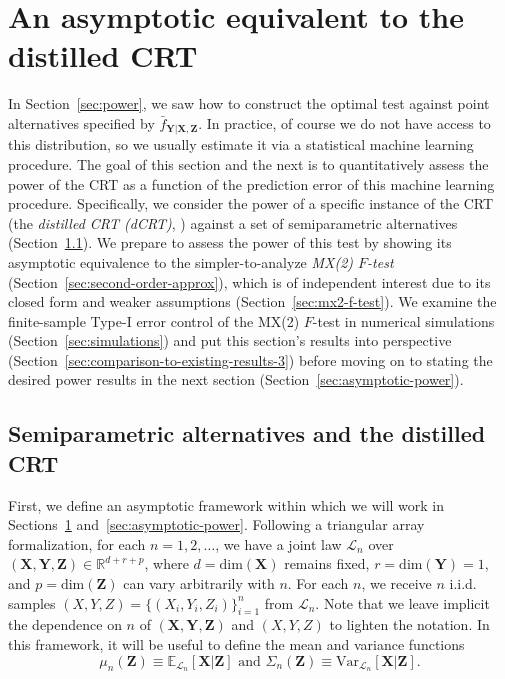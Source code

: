 \documentclass[ejs]{imsart}
\numberwithin{equation}{section}
\theoremstyle{plain}
\theoremstyle{definition}
\theoremstyle{remark}
\newcommand{\prx}{\bm X}
\newcommand{\srx}{X}
\newcommand{\prz}{\bm Z}
\newcommand{\srz}{Z}
\newcommand{\pry}{{\bm Y}}
\newcommand{\sry}{Y}
\begin{document}
\section{An asymptotic equivalent to the distilled CRT} \label{sec:weakening}

In Section~\ref{sec:power}, we saw how to construct the optimal test against point alternatives specified by $\bar f_{\pry|\prx,\prz}$. In practice, of course we do not have access to this distribution, so we usually estimate it via a statistical machine learning procedure. The goal of this section and the next is to quantitatively assess the power of the CRT as a function of the prediction error of this machine learning procedure. Specifically, we consider  the power of a specific instance of the CRT (the \textit{distilled CRT (dCRT)}, \cite{Liu2020})  against a set of semiparametric alternatives (Section~\ref{sec:asymptotic-setup}). We prepare to assess the power of this test by showing its asymptotic equivalence to the simpler-to-analyze \textit{MX(2) $F$-test} (Section~\ref{sec:second-order-approx}), which is of independent interest due to its closed form and weaker assumptions (Section~\ref{sec:mx2-f-test}). We examine the finite-sample Type-I error control of the MX(2) $F$-test in numerical simulations (Section~\ref{sec:simulations}) and put this section's results into perspective (Section~\ref{sec:comparison-to-existing-results-3}) before moving on to stating the desired power results in the next section (Section~\ref{sec:asymptotic-power}).


\subsection{Semiparametric alternatives and the distilled CRT} \label{sec:asymptotic-setup}

First, we define an asymptotic framework within which we will work in Sections~\ref{sec:weakening} and~\ref{sec:asymptotic-power}. Following a triangular array formalization, for each $n = 1, 2, \dots$, we have a joint law $\mathcal L_n$ over $(\prx, \pry, \prz) \in \mathbb R^{d + r + p}$, where $d = \text{dim}(\prx)$ remains fixed, $r = \text{dim}(\pry) = 1$, and $p = \text{dim}(\prz)$ can vary arbitrarily with $n$. For each $n$, we receive $n$ i.i.d. samples $(\srx, \sry, \srz) = \{(\srx_i, \sry_i, \srz_i)\}_{i = 1}^n$ from $\mathcal L_n$. Note that we leave implicit the dependence on $n$ of $(\prx,\pry,\prz)$ and $(X,Y,Z)$ to lighten the notation. In this framework, it will be useful to define the mean and variance functions
\begin{equation}
	\mu_n(\prz) \equiv \mathbb E_{\mathcal L_n}[\prx|\prz]  \text{ and } \Sigma_n(\prz) \equiv \text{Var}_{\mathcal L_n}[\prx|\prz].
	\label{eq:conditional-mean-variance}
\end{equation}
\end{document}
